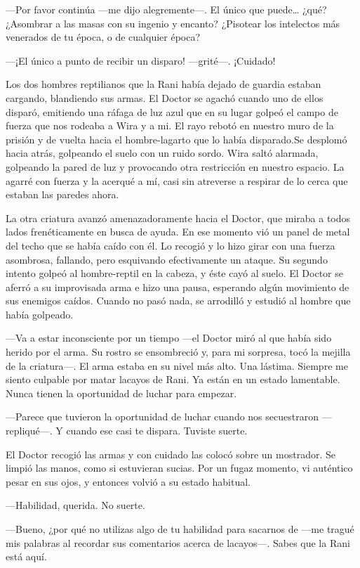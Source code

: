 ---Por favor continúa ---me dijo alegremente---. El único que
puede\ldots{} ¿qué? ¿Asombrar a las masas con su ingenio y encanto?
¿Pisotear los intelectos más venerados de tu época, o de cualquier
época?

---¡El único a punto de recibir un disparo! ---grité---. ¡Cuidado!

Los dos hombres reptilianos que la Rani había dejado de guardia estaban
cargando, blandiendo sus armas. El Doctor se agachó cuando uno de ellos
disparó, emitiendo una ráfaga de luz azul que en su lugar golpeó el
campo de fuerza que nos rodeaba a Wira y a mi. El rayo rebotó en nuestro
muro de la prisión y de vuelta hacia el hombre-lagarto que lo había
disparado.Se desplomó hacia atrás, golpeando el suelo con un ruido
sordo. Wira saltó alarmada, golpeando la pared de luz y provocando otra
restricción en nuestro espacio. La agarré con fuerza y la acerqué a
mí, casi sin atreverse a respirar de lo cerca que estaban las paredes
ahora.

La otra criatura avanzó amenazadoramente hacia el Doctor, que miraba a
todos lados frenéticamente en busca de ayuda. En ese momento vió un
panel de metal del techo que se había caído con él. Lo recogió y lo hizo
girar con una fuerza asombrosa, fallando, pero esquivando efectivamente
un ataque. Su segundo intento golpeó al hombre-reptil en la cabeza, y
éste cayó al suelo. El Doctor se aferró a su improvisada arma e hizo una
pausa, esperando algún movimiento de sus enemigos caídos. Cuando no pasó
nada, se arrodilló y estudió al hombre que había golpeado.

---Va a estar inconsciente por un tiempo ---el Doctor miró al que había
sido herido por el arma. Su rostro se ensombreció y, para mi sorpresa,
tocó la mejilla de la criatura---. El arma estaba en su nivel más alto.
Una lástima. Siempre me siento culpable por matar lacayos de Rani. Ya
están en un estado lamentable. Nunca tienen la oportunidad de luchar
para empezar.

---Parece que tuvieron la oportunidad de luchar cuando nos secuestraron
---repliqué---. Y cuando ese casi te dispara. Tuviste suerte.

El Doctor recogió las armas y con cuidado las colocó sobre un mostrador.
Se limpió las manos, como si estuvieran sucias. Por un fugaz momento, vi
auténtico pesar en sus ojos, y entonces volvió a su estado habitual.

---Habilidad, querida. No suerte.

---Bueno, ¿por qué no utilizas algo de tu habilidad para sacarnos de
---me tragué mis palabras al recordar sus comentarios acerca de
lacayos---. Sabes que la Rani está aquí.

